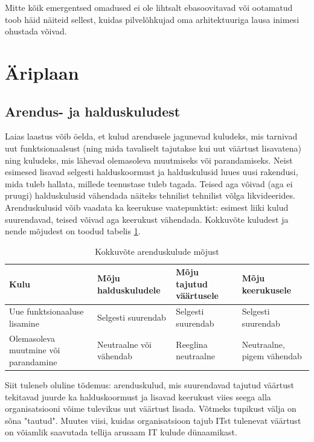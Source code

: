 \documentclass{article}
\begin{document}
Mitte kõik emergentsed omadused ei ole lihtsalt ebasoovitavad või ootamatud \cite{emergence} toob häid näiteid sellest, kuidas pilvelõhkujad oma arhitektuuriga lausa inimesi ohustada võivad.

\section{Äriplaan}
\subsection{Arendus- ja halduskuludest}
\label{sec:kulud}
Laias laastus võib öelda, et kulud arendusele jagunevad kuludeks, mis tarnivad uut funktsionaalsust (ning mida tavaliselt tajutakse kui uut väärtust lisavatena) ning kuludeks, mis lähevad olemasoleva muutmiseks või parandamiseks. Neist esimesed lisavad selgesti halduskoormust ja halduskulusid luues uusi rakendusi, mida tuleb hallata, millede teenustase tuleb tagada. Teised aga võivad (aga ei pruugi) halduskulusid vähendada näiteks tehnilist tehnilist võlga likvideerides. Arenduskulusid võib vaadata ka keerukuse vaatepunktist: esimest liiki kulud suurendavad, teised võivad aga keerukust vähendada. Kokkuvõte kuludest ja nende mõjudest on toodud tabelis \ref{tab:arendus}.

\begin{table}
	\begin{center}
		\begin{tabular}{p{3.8cm}p{2.4cm}p{2.1cm}p{2.7cm}}
		\toprule
Kulu & Mõju \mbox{halduskuludele} & Mõju tajutud väärtusele & Mõju \mbox{keerukusele} \\
\midrule

Uue funktsionaaluse \mbox{lisamine} & Selgesti \mbox{suurendab} & Selgesti \mbox{suurendab} & Selgesti \mbox{suurendab} \\
\addlinespace
Olemasoleva muutmine või parandamine & Neutraalne või vähendab & Reeglina \mbox{neutraalne} & Neutraalne, \mbox{pigem} vähendab \\

\bottomrule
		\end{tabular}
		\caption{Kokkuvõte arenduskulude mõjust}
		\label{tab:arendus}
	\end{center}
\end{table}

Siit tuleneb oluline tõdemus: arenduskulud, mis suurendavad tajutud väärtust tekitavad juurde ka halduskoormust ja lisavad keerukust viies seega alla organisatsiooni võime tulevikus uut väärtust lisada. Võtmeks tupikust välja on sõna "tautud". Muutes viisi, kuidas organisatsioon tajub ITst tulenevat väärtust on võiamlik saavutada tellija arusaam IT kulude dünaamikast. 
\end{document}

